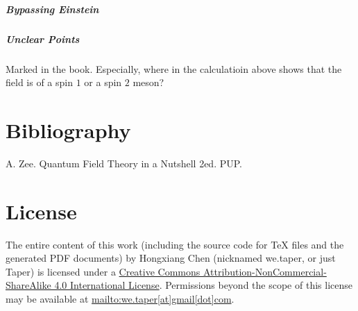 \documentclass{book}
\numberwithin{equation}{subsection} %
\theoremstyle{definition}
\begin{document}
\paragraph{Bypassing Einstein}
\paragraph{Unclear Points} Marked in the book. Especially, where
in the calculatioin above shows that the field is of a spin $1$
or a spin $2$ meson?

\chapter{Bibliography}
\begin{thebibliography}{1}
	 A. Zee. Quantum Field Theory in a Nutshell
		2ed. PUP.
\end{thebibliography}
\chapter{License}
The entire content of this work (including the source code
for TeX files and the generated PDF documents) by 
Hongxiang Chen (nicknamed we.taper, or just Taper) is
licensed under a 
\href{http://creativecommons.org/licenses/by-nc-sa/4.0/}{Creative 
	Commons Attribution-NonCommercial-ShareAlike 4.0 International 
	License}. Permissions beyond the scope of this 
license may be available at \url{mailto:we.taper[at]gmail[dot]com}.

\printnomenclature
\end{document}
